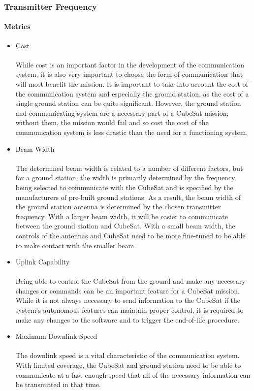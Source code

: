 \documentclass{ece}
\begin{document}
\subsubsection{Transmitter Frequency}
\paragraph{Metrics}
\begin{itemize}
    \item Cost \\
    \\
While cost is an important factor in the development of the communication system, it is also very important to choose the form of communication that will most benefit the mission. It is important to take into account the cost of the communication system and especially the ground station, as the cost of a single ground station can be quite significant. However, the ground station and communicating system are a necessary part of a CubeSat mission; without them, the mission would fail and so cost the cost of the communication system is less drastic than the need for a functioning system. 
    \item Beam Width \\
    \\
The determined beam width is related to a number of different factors, but for a ground station, the width is primarily determined by the frequency being selected to communicate with the CubeSat and is specified by the manufacturers of pre-built ground stations. As a result, the beam width of the ground station antenna is determined by the chosen transmitter frequency. With a larger beam width, it will be easier to communicate between the ground station and CubeSat. With a small beam width, the controls of the antennas and CubeSat need to be more fine-tuned to be able to make contact with the smaller beam.
    \item Uplink Capability \\
    \\
Being able to control the CubeSat from the ground and make any necessary changes or commands can be an important feature for a CubeSat mission. While it is not always necessary to send information to the CubeSat if the system’s autonomous features can maintain proper control, it is required to make any changes to the software and to trigger the end-of-life procedure.
    \item Maximum Downlink Speed \\
    \\
The downlink speed is a vital characteristic of the communication system. With limited coverage, the CubeSat and ground station need to be able to communicate at a fast-enough speed that all of the necessary information can be transmitted in that time.
\end{itemize}
\end{document}
